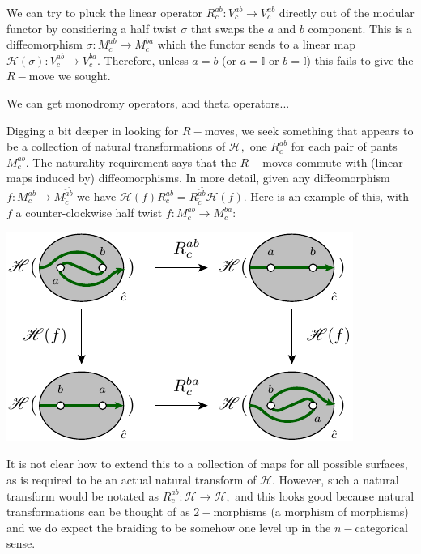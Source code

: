 \documentclass[aps, prl, letterpaper, twocolumn, superscriptaddress, notitlepage, 10pt]{revtex4-1}
\newcommand{\vac}{\mathbb{I}}
\newcommand{\F}{\mathscr{H}} %
\begin{document}
We can try to pluck the linear
operator $R^{ab}_c:V^{ab}_c\to V^{ab}_c$
directly out of the
modular functor by considering a half twist
$\sigma$ that swaps the $a$ and $b$ component.
This is a diffeomorphism $\sigma:M^{ab}_c\to M^{ba}_c$
which the functor sends to a 
linear map $\F(\sigma):V^{ab}_c\to V^{ba}_c.$
Therefore, unless $a=b$ (or $a=\vac$ or $b=\vac$)
this fails to give the $R-$move we sought.

We can get monodromy operators, and theta operators...

Digging a bit deeper in looking for $R-$moves,
we seek something that
appears to be a collection of natural transformations of $\F,$
one $R^{ab}_c$ for each pair of pants $M^{ab}_c.$
The naturality requirement says that
the $R-$moves commute with (linear maps induced by) diffeomorphisms.
In more detail,
given any diffeomorphism
$f:M^{ab}_c\to M^{\tilde{a}\tilde{b}}_{\tilde{c}}$
we have $\F(f)R^{ab}_c=R^{\tilde{a}\tilde{b}}_{\tilde{c}}\F(f).$
Here is an example of this, with $f$ a counter-clockwise half twist
$f:M^{ab}_c\to M^{ba}_c:$
\begin{center}
\includegraphics[]{pic-natural.pdf}
\end{center}
It is not clear how to extend this to
a collection of maps for all possible surfaces, as is
required to be an actual
natural transform of $\F.$
However, such a natural transform would be notated as 
$ R^{ab}_c : \F\to\F,$
and this looks good because natural transformations
can be thought of as $2-$morphisms (a morphism of morphisms) and we
do expect the braiding to be somehow one level up
in the $n-$categorical sense.
\end{document}
